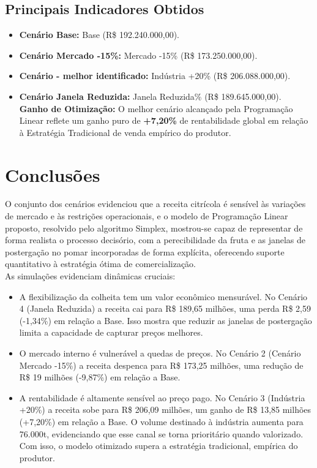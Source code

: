 \documentclass[12pt, a4paper]{article}
\begin{document}
\subsection{Principais Indicadores Obtidos}
\begin{itemize}
    \item \textbf{Cenário Base:} Base (R\$ 192.240.000,00).
    \item \textbf{Cenário Mercado -15\%:} Mercado -15\% (R\$ 173.250.000,00).
    \item \textbf{Cenário - melhor identificado:} Indústria +20\% (R\$ 206.088.000,00).
    \item \textbf{Cenário Janela Reduzida:} Janela Reduzida\% (R\$ 189.645.000,00).\\[0.3cm]
    \textbf{Ganho de Otimização:} O melhor cenário alcançado pela Programação Linear reflete um ganho puro de \textbf{+7,20\%} de rentabilidade global em relação à Estratégia Tradicional de venda empírico do produtor.
\end{itemize}

\section{Conclusões}
O conjunto dos cenários evidenciou que a receita citrícola é sensível às variações de mercado e às restrições operacionais, e o modelo de Programação Linear proposto, resolvido pelo algoritmo Simplex, mostrou-se capaz de representar de forma realista o processo decisório, com a perecibilidade da fruta e as janelas de postergação no pomar incorporadas de forma explícita, oferecendo suporte quantitativo à estratégia ótima de comercialização. \\[0.05cm]

As simulações evidenciam dinâmicas cruciais:
\begin{itemize}
    \item A flexibilização da colheita tem um valor econômico mensurável. No Cenário 4 (Janela Reduzida) a receita cai para R\$ 189,65 milhões, uma perda R\$ 2,59 (-1,34\%) em relação a Base. Isso mostra que reduzir as janelas de postergação limita a capacidade de capturar preços melhores. 
     \item O mercado interno é vulnerável a quedas de preços. No Cenário 2 (Cenário Mercado -15\%) a receita despenca para R\$ 173,25 milhões, uma redução de R\$ 19 milhões (-9,87\%) em relação a Base.
    \item A rentabilidade é altamente sensível ao preço pago. No Cenário 3 (Indústria +20\%) a receita sobe para R\$ 206,09 milhões, um ganho de R\$ 13,85 milhões (+7,20\%) em relação a Base. O volume destinado à indústria aumenta para 76.000t, evidenciando que esse canal se torna prioritário quando valorizado. Com isso, o modelo otimizado supera a estratégia tradicional, empírica do produtor.  
\end{itemize}
\end{document}
